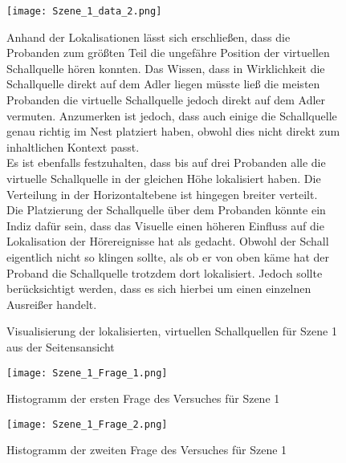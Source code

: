 \begin{figure}[H]
\begin{minipage}[t]{7cm}
\vspace{0pt}
\centering
\texttt{[image: Szene\_1\_data\_2.png]}
\caption{Visualisierung der lokalisierten, virtuellen Schallquellen für Szene 1 aus der Seitensansicht}
\label{fig:Szene_1_data_2}
\end{minipage}
\hfill
\begin{minipage}[t]{9.5cm}
\vspace{0pt}

Anhand der Lokalisationen lässt sich erschließen, dass die Probanden zum größten Teil die ungefähre Position der virtuellen Schallquelle hören konnten. Das Wissen, dass in Wirklichkeit die Schallquelle direkt auf dem Adler liegen müsste ließ die meisten Probanden die virtuelle Schallquelle jedoch direkt auf dem Adler vermuten. Anzumerken ist jedoch, dass auch einige die Schallquelle genau richtig im Nest platziert haben, obwohl dies nicht direkt zum inhaltlichen Kontext passt. \\

Es ist ebenfalls festzuhalten, dass bis auf drei Probanden alle die virtuelle Schallquelle in der gleichen Höhe lokalisiert haben. Die Verteilung in der Horizontaltebene ist hingegen breiter verteilt. \\

Die Platzierung der Schallquelle über dem Probanden könnte ein Indiz dafür sein, dass das Visuelle einen höheren Einfluss auf die Lokalisation der Hörereignisse hat als gedacht. Obwohl der Schall eigentlich nicht so klingen sollte, als ob er von oben käme hat der Proband die Schallquelle trotzdem dort lokalisiert. Jedoch sollte berücksichtigt werden, dass es sich hierbei um einen einzelnen Ausreißer handelt.
\end{minipage}
\end{figure}

   \begin{figure}[H]
\centering
\texttt{[image: Szene\_1\_Frage\_1.png]}
\caption{Histogramm der ersten Frage des Versuches für Szene 1}
\label{fig:Szene_1_Frage1}
\end{figure} 

   \begin{figure}[H]
\centering
\texttt{[image: Szene\_1\_Frage\_2.png]}
\caption{Histogramm der zweiten Frage des Versuches für Szene 1}
\label{fig:Szene_1_Frage2}
\end{figure} 

